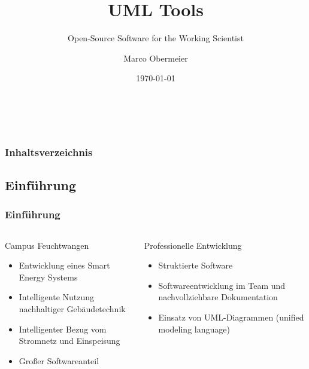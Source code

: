 \documentclass[xcolor=dvipsnames]{beamer}
\title{ UML Tools}
\subtitle{Open-Source Software for the Working Scientist \\}
\institute{Master of Applied Research\\ Hochschule Ansbach\\}
\author{Marco Obermeier}
\date{\today}
\begin{document}
 
	\begin{frame}
		\frametitle{~}
		\maketitle 
	\end{frame}
	\begin{frame}
		\frametitle{Inhaltsverzeichnis}
		\tableofcontents
	\end{frame}
	
	
	\begin{frame}
		\section{Einführung}
		\frametitle{Einführung}
		\begin{columns}
			\begin{column}{0.50\textwidth}
				\begin{block}{Campus Feuchtwangen}
					\begin{itemize}
						\item Entwicklung eines Smart Energy Systems
						\item Intelligente Nutzung nachhaltiger Gebäudetechnik
						\item Intelligenter Bezug vom Stromnetz und Einspeisung
						\item Großer Softwareanteil
					\end{itemize}
				\end{block}
			\end{column}
			
			\begin{column}{0.50\textwidth}
				\begin{block}{Professionelle Entwicklung}
					\begin{itemize}
						\item Struktierte Software
						\item Softwareentwicklung im Team und nachvollziehbare Dokumentation
						\item Einsatz von UML-Diagrammen (unified modeling language)
					\end{itemize}
				\end{block}
			\end{column}
		\end{columns}
		
	\end{frame}
	
\end{document}

